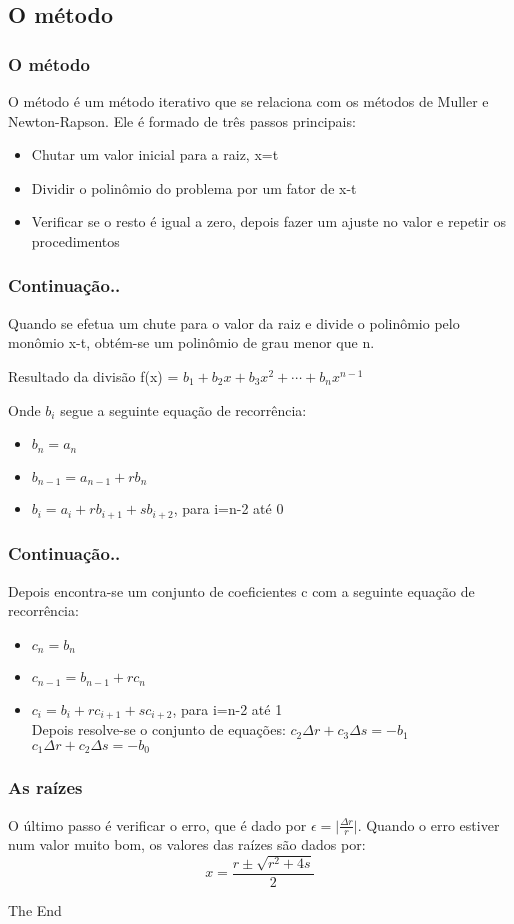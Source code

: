 \documentclass{beamer}
\begin{document}
\subsection{O método}
\begin{frame}
	\frametitle{O método}
	O método é um método iterativo que se relaciona com os métodos de Muller e Newton-Rapson. Ele é formado de três passos principais:
	\begin{itemize}
		\item Chutar um valor inicial para a raiz, x=t
		\item Dividir o polinômio do problema por um fator de x-t
		\item Verificar se o resto é igual a zero, depois fazer um ajuste no valor e repetir os procedimentos
	\end{itemize}
\end{frame}
\begin{frame}
\frametitle{Continuação..}
	Quando se efetua um chute para o valor da raiz e divide o polinômio pelo monômio x-t, obtém-se um polinômio de grau menor que n.
	
	\begin{block}{Resultado da divisão}
		f(x) = $b_1 + b_2 x + b_3 x^2 + \cdots + b_n x^{n-1}$
	\end{block}

    Onde $b_i$ segue a seguinte equação de recorrência:
    \begin{itemize}
    	\item $b_n = a_n$
    	\item $b_{n-1} = a_{n-1} + rb_n$
    	\item $b_i = a_i + rb_{i+1} + sb_{i+2}$, para i=n-2 até 0
    \end{itemize}
\end{frame}
\begin{frame}
\frametitle{Continuação..}
Depois encontra-se um conjunto de coeficientes c com a seguinte equação de recorrência:
\begin{itemize}
	\item $c_n = b_n$
	\item $c_{n-1} = b_{n-1} + rc_n$
	\item $c_i = b_i + rc_{i+1} + sc_{i+2}$, para i=n-2 até 1
\\
Depois resolve-se o conjunto de equações:
$c_2 \Delta r + c_3 \Delta s = - b_1$ \\
$c_1 \Delta r + c_2 \Delta s = - b_0$
\end{itemize}
\end{frame}
\begin{frame}
\frametitle{As raízes}
O último passo é verificar o erro, que é dado por $\epsilon = \vert \frac{\Delta r}{r} \vert$. Quando o erro estiver num valor muito bom, os valores das raízes são dados por:
\begin{equation}
	x = \frac{r \pm \sqrt{r^2 + 4s}}{2}
\end{equation}
\end{frame}

\begin{frame}
\Huge{\centerline{The End}}
\end{frame}

\end{document}
